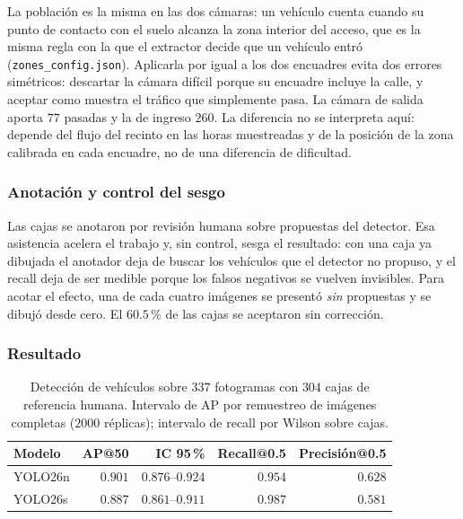 La población es la misma en las dos cámaras: un vehículo cuenta cuando su punto de
contacto con el suelo alcanza la zona interior del acceso, que es la misma regla
con la que el extractor decide que un vehículo entró
(\texttt{zones\_config.json}). Aplicarla por
igual a los dos encuadres evita dos errores simétricos: descartar la cámara difícil
porque su encuadre incluye la calle, y aceptar como muestra el tráfico que
simplemente pasa. La cámara de salida aporta $77$ pasadas y la de ingreso $260$. La
diferencia no se interpreta aquí: depende del flujo del recinto en las horas
muestreadas y de la posición de la zona calibrada en cada encuadre, no de una
diferencia de dificultad.

\subsubsection{Anotación y control del sesgo}

Las cajas se anotaron por revisión humana sobre propuestas del detector. Esa
asistencia acelera el trabajo y, sin control, sesga el resultado: con una caja ya
dibujada el anotador deja de buscar los vehículos que el detector no propuso, y el
recall deja de ser medible porque los falsos negativos se vuelven invisibles. Para
acotar el efecto, una de cada cuatro imágenes se presentó \emph{sin} propuestas y
se dibujó desde cero. El $60{.}5$\,\% de las cajas se aceptaron sin corrección.

\subsubsection{Resultado}

\begin{table}[H]
    \centering
    \caption{Detección de vehículos sobre $337$ fotogramas con $304$ cajas de
    referencia humana. Intervalo de AP por remuestreo de imágenes completas
    ($2000$ réplicas); intervalo de recall por Wilson sobre cajas.}
    \label{tab:h11}
    \begin{tabular}{lrrrr}
        \toprule
        \textbf{Modelo} & \textbf{AP@50} & \textbf{IC 95\,\%} &
        \textbf{Recall@0.5} & \textbf{Precisión@0.5} \\
        \midrule
        YOLO26n & $0{.}901$ & $0{.}876$--$0{.}924$ & $0{.}954$ & $0{.}628$ \\
        YOLO26s & $0{.}887$ & $0{.}861$--$0{.}911$ & $0{.}987$ & $0{.}581$ \\
        \bottomrule
    \end{tabular}
\end{table}

